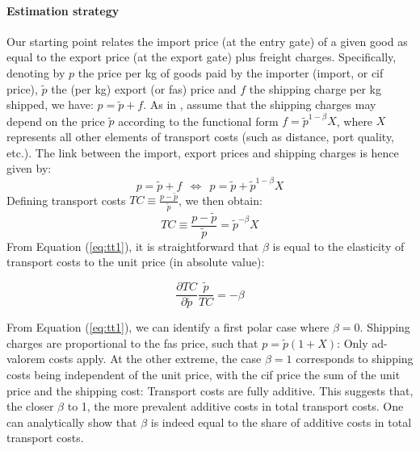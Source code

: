 \documentclass[a4paper,11pt]{article}
\begin{document}
\paragraph{Estimation strategy} Our starting point relates the import price (at the entry gate) of a given good as equal to the export price (at the export gate) plus freight charges. Specifically, denoting by $p$ the price per kg of goods paid by the importer (import, or cif price), $\widetilde{p}$ the (per kg) export (or fas) price and $f$ the shipping charge per kg shipped, we have: $ p = \widetilde{p} +f$. As in \cite{hummels2010}, assume that the shipping charges may depend on the price $\widetilde{p}$ according to the functional form $f = \widetilde{p}^{1-\beta} X$, where $X$ represents all other elements of transport costs (such as distance, port quality, etc.). The link between the import, export prices and shipping charges is hence given by:
$$ p = \widetilde{p}+f ~~ \Leftrightarrow  ~~ p = \widetilde{p}+\widetilde{p}^{1-\beta} X $$
Defining transport costs $TC \equiv \frac{p-\widetilde{p}}{\widetilde{p}}$, we then obtain:
\begin{equation}
TC \equiv \frac{p-\widetilde{p}}{\widetilde{p}} = \widetilde{p}^{-\beta} X \label{eq:tt1}
\end{equation}
From Equation (\ref{eq:tt1}), it is straightforward that $\beta$ is equal to the elasticity of transport costs to the unit price (in absolute value):

\begin{equation}
\frac{\partial TC}{\partial \widetilde{p}} \frac{\widetilde{p}}{TC} = - \beta \label{eq:alternative}
\end{equation}

From Equation (\ref{eq:tt1}), we can identify a first polar case where $\beta=0$. Shipping charges are proportional to the fas price, such that $p=\widetilde{p}(1+X)$: Only ad-valorem costs apply. At the other extreme, the case $\beta=1$ corresponds to shipping costs being independent of the unit price, with the cif price the sum of the unit price and the shipping cost: Transport costs are fully additive.
This suggests that, the closer $\beta$ to 1, the more prevalent additive costs in total transport costs. One can analytically show that $\beta$ is indeed equal to the share of additive costs in total transport costs.
\end{document}
